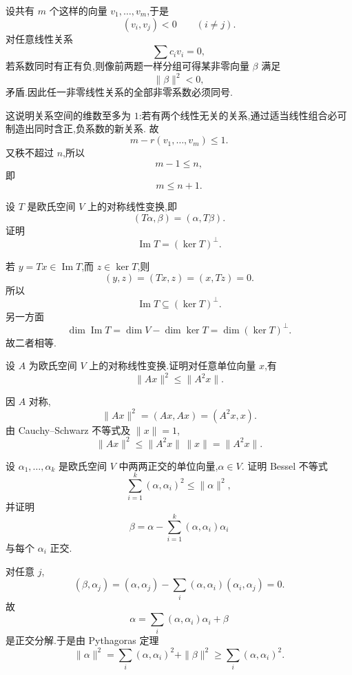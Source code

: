 \begin{solution}
设共有 $m$ 个这样的向量 $v_1,\ldots,v_m$,于是
\[
(v_i,v_j)<0
\qquad(i\neq j).
\]
对任意线性关系
\[
\displaystyle\sum c_iv_i=0,
\]
若系数同时有正有负,则像前两题一样分组可得某非零向量 $\beta$ 满足
\[
\|\beta\|^2<0,
\]
矛盾.因此任一非零线性关系的全部非零系数必须同号.

这说明关系空间的维数至多为 $1$:若有两个线性无关的关系,通过适当线性组合必可制造出同时含正,负系数的新关系.
故
\[
m-r(v_1,\ldots,v_m)\le1.
\]
又秩不超过 $n$,所以
\[
 m-1\le n,
\]
即
\[
\boxed{m\le n+1}.
\]
\end{solution}


\begin{example}[\markstar]
设 $T$ 是欧氏空间 $V$ 上的对称线性变换,即
\[
(T\alpha,\beta)=(\alpha,T\beta).
\]
证明
\[
\operatorname{Im}T=(\ker T)^\perp.
\]
\end{example}
\exampleblank

\begin{solution}
若 $y=T x\in\operatorname{Im}T$,而 $z\in\ker T$,则
\[
(y,z)
=
(Tx,z)
=
(x,Tz)=0.
\]
所以
\[
\operatorname{Im}T\subseteq(\ker T)^\perp.
\]
另一方面
\[
\dim\operatorname{Im}T
=
\dim V-\dim\ker T
=
\dim(\ker T)^\perp.
\]
故二者相等.
\end{solution}


\begin{example}
设 $A$ 为欧氏空间 $V$ 上的对称线性变换.证明对任意单位向量 $x$,有
\[
\|Ax\|^2\le\|A^2x\|.
\]
\end{example}
\exampleblank

\begin{solution}
因 $A$ 对称,
\[
\|Ax\|^2
=(Ax,Ax)
=(A^2x,x).
\]
由 Cauchy--Schwarz 不等式及 $\|x\|=1$,
\[
\|Ax\|^2
\le
\|A^2x\|\,\|x\|
=
\|A^2x\|.
\]
\end{solution}


\begin{example}[\markstar]
设 $\alpha_1,\ldots,\alpha_k$ 是欧氏空间 $V$ 中两两正交的单位向量,$\alpha\in V$.
证明 Bessel 不等式
\[
\displaystyle\sum\limits_{i=1}^{k}(\alpha,\alpha_i)^2
\le
\|\alpha\|^2,
\]
并证明
\[
\beta
=
\alpha-
\sum\limits_{i=1}^{k}(\alpha,\alpha_i)\alpha_i
\]
与每个 $\alpha_i$ 正交.
\end{example}
\exampleblank

\begin{solution}
对任意 $j$,
\[
(\beta,\alpha_j)
=
(\alpha,\alpha_j)
-
\sum_i(\alpha,\alpha_i)(\alpha_i,\alpha_j)
=0.
\]
故
\[
\alpha
=
\sum_i(\alpha,\alpha_i)\alpha_i+\beta
\]
是正交分解.于是由 Pythagoras 定理
\[
\|\alpha\|^2
=
\sum_i(\alpha,\alpha_i)^2+\|\beta\|^2
\ge
\sum_i(\alpha,\alpha_i)^2.
\]
\end{solution}


